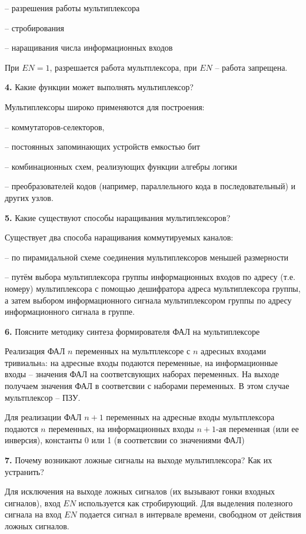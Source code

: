 \documentclass[a4paper,12pt]{article}
\begin{document}
\noindent -- разрешения работы мультиплексора

\noindent -- стробирования

\noindent -- наращивания числа информационных входов\newline

\noindent При $EN = 1$, разрешается работа мультплексора, при $EN$ -- работа запрещена.\newline

\noindent\textbf{4.} Какие функции может выполнять мультиплексор?\newline

\noindent Мультиплексоры широко применяются для построения:\newline

\noindent -- коммутаторов-селекторов,

\noindent -- постоянных запоминающих устройств емкостью бит

\noindent -- комбинационных схем, реализующих функции алгебры логики

\noindent -- преобразователей кодов (например, параллельного кода в последовательный) и других узлов.

\clearpage
\noindent\textbf{5.} Какие существуют способы наращивания мультиплексоров?\newline

\noindent Существует два способа наращивания коммутируемых каналов:\newline

\noindent -- по пирамидальной схеме соединения мультиплексоров меньшей размерности

\noindent -- путём выбора мультиплексора группы информационных входов по адресу (т.е. номеру) мультиплексора с помощью дешифратора адреса мультиплексора группы, а затем выбором информационного сигнала мультиплексором группы по адресу информационного сигнала в группе.\newline

\noindent\textbf{6.} Поясните методику синтеза формирователя ФАЛ на мультиплексоре\newline

\noindent Реализация ФАЛ $n$ переменных на мультплексоре с $n$ адресных входами тривиальнa: на адресные входы подаются переменные, на информационные входы -- значения ФАЛ на соответсвующих наборах переменных. На выходе получаем значения ФАЛ в соответсвии с наборами переменных. В этом случае мультплексор -- ПЗУ.\newline

\noindent Для реализации ФАЛ $n + 1$ переменных на адресные входы мультплексора подаются $n$ переменных, на информационных входы $n + 1$-ая переменная (или ее инверсия), константы 0 или 1 (в соответсвии со значениями ФАЛ)\newline

\noindent\textbf{7. } Почему возникают ложные сигналы на выходе мультиплексора? Как их устранить?\newline

\noindent Для исключения на выходе ложных сигналов (их вызывают гонки входных сигналов), вход $EN$ используется как стробирующий. Для выделения полезного сигнала на вход $EN$ подается сигнал в интервале времени, свободном от действия ложных сигналов.
\end{document}
